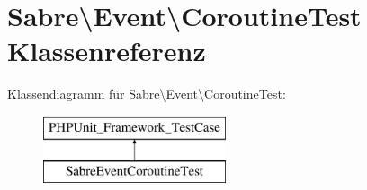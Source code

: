 \hypertarget{class_sabre_1_1_event_1_1_coroutine_test}{}\section{Sabre\textbackslash{}Event\textbackslash{}Coroutine\+Test Klassenreferenz}
\label{class_sabre_1_1_event_1_1_coroutine_test}
Klassendiagramm für Sabre\textbackslash{}Event\textbackslash{}Coroutine\+Test\+:\begin{figure}[H]
\begin{center}
\leavevmode
\includegraphics[height=2.000000cm]{class_sabre_1_1_event_1_1_coroutine_test}
\end{center}
\end{figure}
